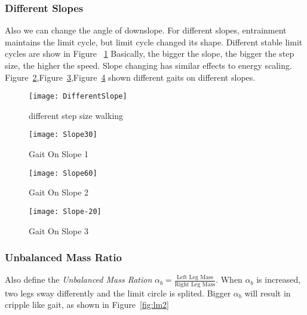 \subsubsection*{Different Slopes}
Also we can change the angle of downslope.
For different slopes, entrainment maintains the limit cycle, but limit cycle changed its shape.
Different stable limit cycles are show in Figure ~\ref{fig:diffslopes}
Basically, the bigger the slope, the bigger the step size, the higher the speed.
Slope changing has similar effects to energy scaling.
Figure~\ref{fig:ss1},Figure~\ref{fig:ss2},Figure~\ref{fig:ss3} shown different gaits on different slopes.


\begin{figure}[!htbp]
  \begin{center}
      \texttt{[image: DifferentSlope]}
    \caption{different step size walking}
    \label{fig:diffslopes}
\end{center}
\end{figure}


\begin{figure}[!htbp]
  \begin{center}
      \texttt{[image: Slope30]}
    \caption{Gait On Slope 1} 
    \label{fig:ss1}
\end{center}
\end{figure}

\begin{figure}[!htbp]
  \begin{center}
      \texttt{[image: Slope60]}
    \caption{Gait On Slope 2}
    \label{fig:ss2}
\end{center}
\end{figure}

\begin{figure}[!htbp]
  \begin{center}
      \texttt{[image: Slope-20]}
    \caption{Gait On Slope 3}
    \label{fig:ss3}
\end{center}
\end{figure}




\subsubsection*{Unbalanced Mass Ratio}
Also define the \emph{Unbalanced Mass Ration} $\alpha_b=\frac{\text{Left Leg Mass}}{\text{Right Leg Mass}}$.
When $\alpha_b$ is increased, two legs sway differently and the limit circle is splited.
Bigger $\alpha_b$  will result in cripple like gait, as shown in Figure~\ref{fig:lm2}

